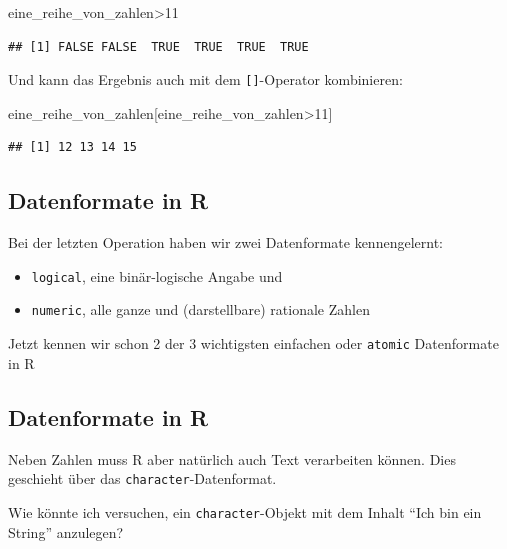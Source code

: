 \documentclass[
]{book}
\newenvironment{Shaded}{\begin{snugshade}}{\end{snugshade}}
\newcommand{\DecValTok}[1]{\textcolor[rgb]{0.00,0.00,0.81}{#1}}
\newcommand{\NormalTok}[1]{#1}
\newcommand{\SpecialCharTok}[1]{\textcolor[rgb]{0.00,0.00,0.00}{#1}}
\begin{document}
\begin{Shaded}
\begin{Highlighting}[]
\NormalTok{eine\_reihe\_von\_zahlen}\SpecialCharTok{\textgreater{}}\DecValTok{11}
\end{Highlighting}
\end{Shaded}

\begin{verbatim}
## [1] FALSE FALSE  TRUE  TRUE  TRUE  TRUE
\end{verbatim}

Und kann das Ergebnis auch mit dem \texttt{{[}{]}}-Operator kombinieren:

\begin{Shaded}
\begin{Highlighting}[]
\NormalTok{eine\_reihe\_von\_zahlen[eine\_reihe\_von\_zahlen}\SpecialCharTok{\textgreater{}}\DecValTok{11}\NormalTok{]}
\end{Highlighting}
\end{Shaded}

\begin{verbatim}
## [1] 12 13 14 15
\end{verbatim}

\hypertarget{datenformate-in-r}{%
\subsection{Datenformate in R}\label{datenformate-in-r}}

Bei der letzten Operation haben wir zwei Datenformate kennengelernt:

\begin{itemize}
\item
  \texttt{logical}, eine binär-logische Angabe und
\item
  \texttt{numeric}, alle ganze und (darstellbare) rationale Zahlen
\end{itemize}

Jetzt kennen wir schon 2 der 3 wichtigsten einfachen oder \texttt{atomic} Datenformate in R

\hypertarget{datenformate-in-r-1}{%
\subsection{Datenformate in R}\label{datenformate-in-r-1}}

Neben Zahlen muss R aber natürlich auch Text verarbeiten können. Dies geschieht über das \texttt{character}-Datenformat.

Wie könnte ich versuchen, ein \texttt{character}-Objekt mit dem Inhalt ``Ich bin ein String'' anzulegen?
\end{document}
